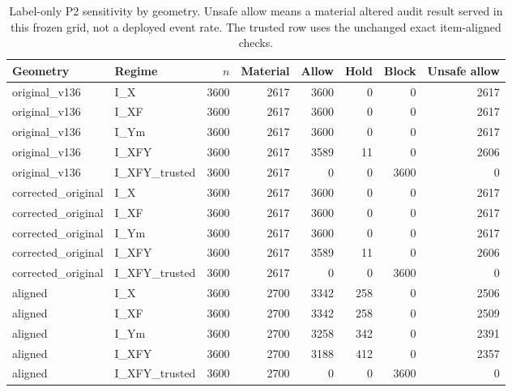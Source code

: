 \begin{table}[!t]
\caption{Label-only P2 sensitivity by geometry. Unsafe allow means a material altered audit result served in this frozen grid, not a deployed event rate. The trusted row uses the unchanged exact item-aligned checks.}
\label{tab:v137-label-policy}
\centering\footnotesize
\begin{tabular}{@{}llrrrrrr@{}}
\toprule
Geometry & Regime & $n$ & Material & Allow & Hold & Block & Unsafe allow \\
\midrule
original\_v136 & I\_X & 3600 & 2617 & 3600 & 0 & 0 & 2617 \\
original\_v136 & I\_XF & 3600 & 2617 & 3600 & 0 & 0 & 2617 \\
original\_v136 & I\_Ym & 3600 & 2617 & 3600 & 0 & 0 & 2617 \\
original\_v136 & I\_XFY & 3600 & 2617 & 3589 & 11 & 0 & 2606 \\
original\_v136 & I\_XFY\_trusted & 3600 & 2617 & 0 & 0 & 3600 & 0 \\
corrected\_original & I\_X & 3600 & 2617 & 3600 & 0 & 0 & 2617 \\
corrected\_original & I\_XF & 3600 & 2617 & 3600 & 0 & 0 & 2617 \\
corrected\_original & I\_Ym & 3600 & 2617 & 3600 & 0 & 0 & 2617 \\
corrected\_original & I\_XFY & 3600 & 2617 & 3589 & 11 & 0 & 2606 \\
corrected\_original & I\_XFY\_trusted & 3600 & 2617 & 0 & 0 & 3600 & 0 \\
aligned & I\_X & 3600 & 2700 & 3342 & 258 & 0 & 2506 \\
aligned & I\_XF & 3600 & 2700 & 3342 & 258 & 0 & 2509 \\
aligned & I\_Ym & 3600 & 2700 & 3258 & 342 & 0 & 2391 \\
aligned & I\_XFY & 3600 & 2700 & 3188 & 412 & 0 & 2357 \\
aligned & I\_XFY\_trusted & 3600 & 2700 & 0 & 0 & 3600 & 0 \\
\bottomrule
\end{tabular}
\end{table}
